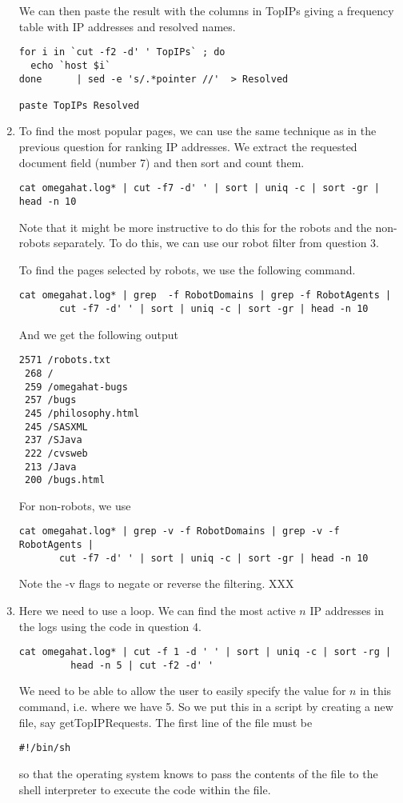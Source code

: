 \documentclass[10pt]{article}
\begin{document}
\begin{enumerate}
We can then paste the result with the columns in
TopIPs giving a frequency table with IP addresses
and resolved names.
\begin{verbatim}
for i in `cut -f2 -d' ' TopIPs` ; do
  echo `host $i`
done      | sed -e 's/.*pointer //'  > Resolved

paste TopIPs Resolved
\end{verbatim}


\item  %
To find the most popular pages, we can use the same technique as in
the previous question for ranking IP addresses.
We extract the requested document field (number 7)
and then sort and count them.
\begin{verbatim}
cat omegahat.log* | cut -f7 -d' ' | sort | uniq -c | sort -gr | head -n 10
\end{verbatim}

Note that it might be more instructive to do this for 
the robots and the non-robots separately.
To do this, we can use our robot filter from question 3.

To find the pages selected by robots, we use the following command.
\begin{verbatim}
cat omegahat.log* | grep  -f RobotDomains | grep -f RobotAgents |  
       cut -f7 -d' ' | sort | uniq -c | sort -gr | head -n 10
\end{verbatim}
And we get the following output 
\begin{verbatim}
2571 /robots.txt
 268 /
 259 /omegahat-bugs
 257 /bugs
 245 /philosophy.html
 245 /SASXML
 237 /SJava
 222 /cvsweb
 213 /Java
 200 /bugs.html
\end{verbatim}

For non-robots, we use 
\begin{verbatim}
cat omegahat.log* | grep -v -f RobotDomains | grep -v -f RobotAgents |
       cut -f7 -d' ' | sort | uniq -c | sort -gr | head -n 10
\end{verbatim}
Note the -v flags to negate or reverse the filtering.
XXX


\item
Here we need to use a loop.
We can find the most active $n$ IP addresses in the logs using
the code in question 4.
\begin{verbatim}
cat omegahat.log* | cut -f 1 -d ' ' | sort | uniq -c | sort -rg | 
         head -n 5 | cut -f2 -d' '
\end{verbatim}
We need to be able to allow the user to easily specify the value for
$n$
in this command, i.e. where we have 5. So we put this in a script
by creating a new file, say getTopIPRequests.
The first line of the file must be
\begin{verbatim}
#!/bin/sh
\end{verbatim}
so that the operating system knows to pass the contents of the file
to the shell interpreter to execute the code within the file.


\end{enumerate}
\end{document}
